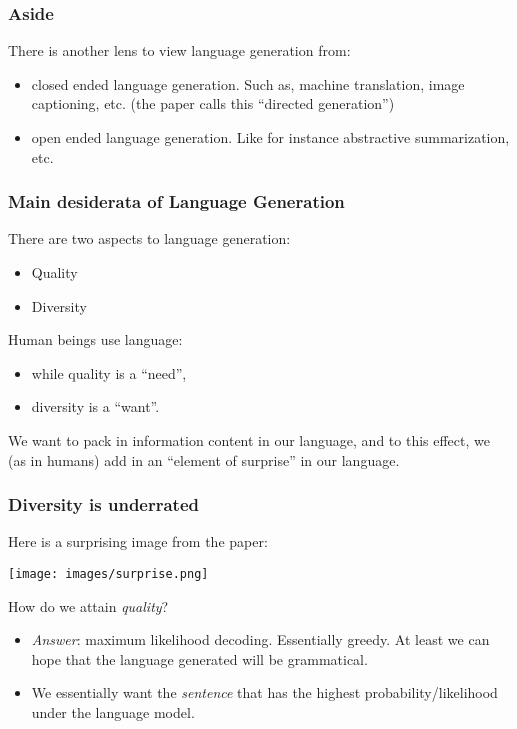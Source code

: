\documentclass[11pt]{beamer}
\begin{document}
\begin{frame}
  \frametitle{Aside}
There is another lens to view language generation from:
\begin{itemize}
  \item closed ended language generation. Such as, machine translation, image captioning, etc.
  (the paper calls this ``directed generation'')
\pause
  \item open ended language generation. Like for instance abstractive summarization, etc.
\end{itemize}
\end{frame}

\begin{frame}
  \frametitle{Main desiderata of Language Generation}
There are two aspects to language generation:
\begin{itemize}
  \item Quality
  \item Diversity
\end{itemize}
Human beings use language:
\begin{itemize}
  \item while quality is a ``need'',
  \item diversity is a ``want''.
\end{itemize}

We want to pack in information content in our language, and to this effect, we
(as in humans) add in an ``element of surprise'' in our language.
\end{frame}

\begin{frame}
  \frametitle{Diversity is underrated}
  Here is a surprising image from the paper:
  \begin{center}
  \texttt{[image: images/surprise.png]}
  \end{center}
\end{frame}

\begin{frame}
  How do we attain {\em quality}?

\begin{itemize}
  \item
  {\em Answer}: maximum likelihood decoding. Essentially greedy.
  At least we can hope that the language generated will be
  grammatical.
\item
  We essentially want the {\em sentence} that has the highest probability/likelihood
  under the language model.
\end{itemize}
\end{frame}
\end{document}
